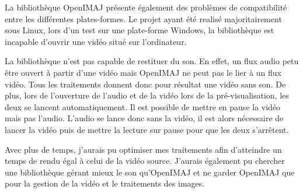 \documentclass[10pt,a4paper]{article}
\begin{document}
La bibliothèque OpenIMAJ présente également des problèmes de compatibilité entre les différentes plates-formes. Le projet ayant été realisé majoritairement sous Linux, lors d'un test sur une plate-forme Windows, la bibliothèque est incapable d'ouvrir une vidéo situé sur l'ordinateur.

La bibliothèque n'est pas capable de restituer du son. En effet, un flux audio petu être ouvert à partir d'une vidéo mais OpenIMAJ ne peut pas le lier à un flux vidéo. Tous les traitements donnent donc pour résultat une vidéo sans son. De plus, lors de l'ouverture de l'audio et de la vidéo lors de la pré-visualisation, les deux se lancent automatiquement. Il est possible de mettre en pause la vidéo mais pas l'audio. L'audio se lance donc sans la vidéo, il est alors nécessaire de lancer la vidéo puis de mettre la lecture sur pause pour que les deux s'arrêtent.

Avec plus de temps, j'aurais pu optimiser mes traitements afin d'atteindre un temps de rendu égal à celui de la vidéo source. J'aurais également pu chercher une bibliothèque gérant mieux le son qu'OpenIMAJ et ne garder OpenIMAJ que pour la gestion de la vidéo et le traitements des images.





\newpage

\end{document}
